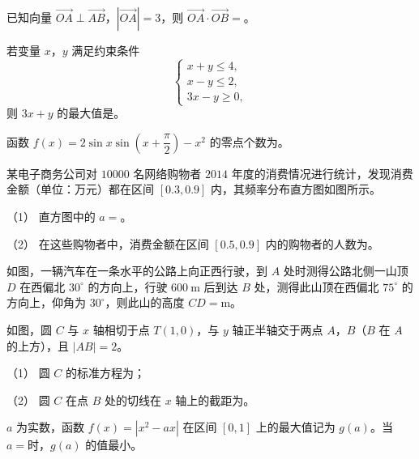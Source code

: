 \begin{question}
已知向量 \(\overrightarrow{OA}\perp\overrightarrow{AB}\)，\(|\overrightarrow{OA}|=3\)，则 \(\overrightarrow{OA}\cdot\overrightarrow{OB}=\)\gkblank{}。

\end{question}
\begin{question}
若变量 \(x\)，\(y\) 满足约束条件
\nopagebreak[4]
\[
\begin{cases}
x+y\leqslant4,\\
x-y\leqslant2,\\
3x-y\geqslant0,
\end{cases}
\]
则 \(3x+y\) 的最大值是\gkblank{}。

\end{question}
\begin{question}
函数 \(f(x)=2\sin x\sin\left(x+\dfrac{\pi}{2}\right)-x^2\) 的零点个数为\gkblank{}。

\Needspace{0.4\textheight}
\end{question}
\begin{question}
某电子商务公司对 \(10000\) 名网络购物者 \(2014\) 年度的消费情况进行统计，发现消费金额（单位：万元）都在区间 \([0.3,0.9]\) 内，其频率分布直方图如图所示。

（1） 直方图中的 \(a=\)\gkblank{}。

（2） 在这些购物者中，消费金额在区间 \([0.5,0.9]\) 内的购物者的人数为\gkblank{}。
\nopagebreak[4]
\begin{center}\end{center}
\nopagebreak[4]
\Needspace{0.4\textheight}
\end{question}
\begin{question}
如图，一辆汽车在一条水平的公路上向正西行驶，到 \(A\) 处时测得公路北侧一山顶 \(D\) 在西偏北 \(30^\circ\) 的方向上，行驶 \(600\ \mathrm{m}\) 后到达 \(B\) 处，测得此山顶在西偏北 \(75^\circ\) 的方向上，仰角为 \(30^\circ\)，则此山的高度 \(CD=\)\gkblank{}\(\mathrm{m}\)。
\nopagebreak[4]
\begin{center}\end{center}
\nopagebreak[4]
\Needspace{0.4\textheight}
\end{question}
\begin{question}
如图，圆 \(C\) 与 \(x\) 轴相切于点 \(T(1,0)\)，与 \(y\) 轴正半轴交于两点 \(A\)，\(B\)（\(B\) 在 \(A\) 的上方），且 \(|AB|=2\)。

（1） 圆 \(C\) 的标准方程为\gkblank{}；

（2） 圆 \(C\) 在点 \(B\) 处的切线在 \(x\) 轴上的截距为\gkblank{}。
\nopagebreak[4]
\begin{center}\end{center}
\nopagebreak[4]
\end{question}
\begin{question}
\(a\) 为实数，函数 \(f(x)=|x^2-ax|\) 在区间 \([0,1]\) 上的最大值记为 \(g(a)\)。当 \(a=\)\gkblank{}时，\(g(a)\) 的值最小。

\end{question}

